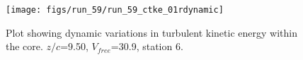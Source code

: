 \begin{figure}[H]
\centering
\texttt{[image: figs/run\_59/run\_59\_ctke\_01rdynamic]}
\caption{Plot showing dynamic variations in turbulent kinetic energy within the core. $z/c$=9.50, $V_{free}$=30.9, station 6.}
\label{fig:run_59_ctke_01rdynamic}
\end{figure}


